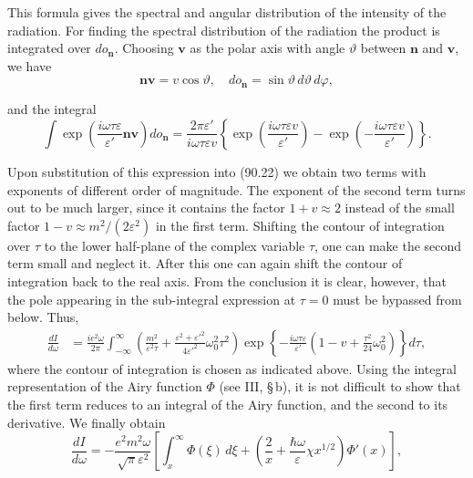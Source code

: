 This formula gives the spectral and angular distribution of the intensity of the radiation. For finding the spectral distribution of the radiation the product is integrated over $do_\mathbf{n}$. Choosing $\mathbf{v}$ as the polar axis with angle $\vartheta$ between $\mathbf{n}$ and $\mathbf{v}$, we have
\[
\mathbf{nv} = v\cos\vartheta, \quad do_\mathbf{n} = \sin\vartheta\,d\vartheta\,d\varphi,
\]


and the integral
\[
\int \exp\!\left(\frac{i\omega\tau\varepsilon}{\varepsilon'}\mathbf{nv}\right)do_\mathbf{n} = \frac{2\pi\varepsilon'}{i\omega\tau\varepsilon v}\left\{\exp\!\left(\frac{i\omega\tau\varepsilon v}{\varepsilon'}\right) - \exp\!\left(-\frac{i\omega\tau\varepsilon v}{\varepsilon'}\right)\right\}.
\]

Upon substitution of this expression into (90.22) we obtain two terms with exponents of different order of magnitude. The exponent of the second term turns out to be much larger, since it contains the factor $1 + v \approx 2$ instead of the small factor $1 - v \approx m^2/(2\varepsilon^2)$ in the first term. Shifting the contour of integration over $\tau$ to the lower half-plane of the complex variable $\tau$, one can make the second term small and neglect it. After this one can again shift the contour of integration back to the real axis. From the conclusion it is clear, however, that the pole appearing in the sub-integral expression at $\tau = 0$ must be bypassed from below. Thus,
\begin{equation}
\begin{split}
\frac{dI}{d\omega} &= \frac{ie^2\omega}{2\pi}\int_{-\infty}^\infty \left(\frac{m^2}{\varepsilon^2\tau} + \frac{\varepsilon^2+\varepsilon'^2}{4\varepsilon'^2}\omega_0^2\tau^2\right)\exp\!\left\{-\frac{i\omega\tau\varepsilon}{\varepsilon'}\left(1 - v + \frac{\tau^2}{24}\omega_0^2\right)\right\}d\tau,
\end{split}
\end{equation}
where the contour of integration is chosen as indicated above. Using the integral representation of the Airy function $\Phi$ (see III, \S\,b), it is not difficult to show that the first term reduces to an integral of the Airy function, and the second to its derivative. We finally obtain
\begin{equation}
\frac{dI}{d\omega} = -\frac{e^2m^2\omega}{\sqrt{\pi}\varepsilon^2}\left[\int_x^\infty \Phi(\xi)\,d\xi + \left(\frac{2}{x} + \frac{\hbar\omega}{\varepsilon}\chi x^{1/2}\right)\Phi'(x)\right],
\label{eq:90.23}
\end{equation}
